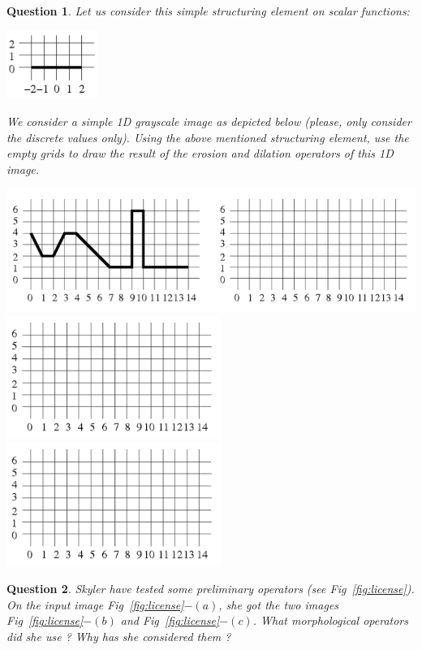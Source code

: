 \documentclass[a4paper, 11pt]{article}
\newtheorem{qu}{Question}
\begin{document}
\begin{qu}
  Let us consider this simple structuring element on scalar functions:
  \begin{center}
    \includegraphics[width=3cm]{elemstruct}
  \end{center}
We consider a simple 1D grayscale image as depicted below (please,
only consider the discrete values only). Using the above mentioned
structuring element, use the empty grids to draw
the result of the erosion and dilation operators of this 1D image.
 \begin{center}
    \includegraphics[width=14cm]{1d}
    \includegraphics[width=7cm]{grille1d}
    \includegraphics[width=7cm]{grille1d}
  \end{center}
\end{qu}



\begin{qu}
  Skyler have tested some preliminary operators (see
  Fig~\ref{fig:license}). On the input image
  Fig~\ref{fig:license}$-(a)$, she got the two images
  Fig~\ref{fig:license}$-(b)$ and  Fig~\ref{fig:license}$-(c)$. What
  morphological operators did she use ? Why has she considered  them ?
\end{qu}
\end{document}
